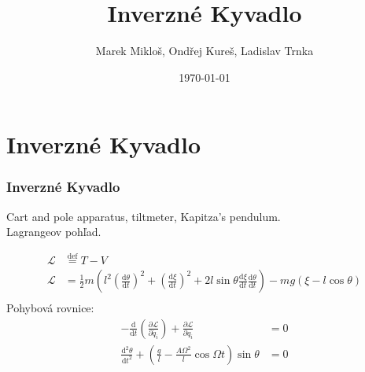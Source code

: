 \documentclass{beamer}
\title[Mechanika]{Inverzné Kyvadlo}
\author[Skupina Z] {Marek Mikloš, Ondřej Kureš, Ladislav Trnka \\ }
\institute[Charles University]{Charles University, Czech Republic}
\date{\today}
\begin{document}
\begin{frame}
\titlepage

\end{frame}


\section*{Inverzné Kyvadlo}
\label{sec: Int}


\begin{frame}
 
\frametitle{Inverzné Kyvadlo}


\begin{center}
Cart and pole apparatus, tiltmeter, Kapitza's pendulum.\\    
Lagrangeov pohľad.\\
\end{center}
\begin{small}
\begin{align*}
\mathcal{L} & \stackrel{\text{def}}{=} T-V  \\
\mathcal{L} & =  \frac{1}{2} m \left( l^{2} \left( \frac{\mathrm{d}\theta}{\mathrm{d}t}\right)^{2}+\left( \frac{\mathrm{d}\xi}{\mathrm{d}t}\right)^{2}+2l \sin \theta \frac{\mathrm{d}\xi}{\mathrm{d}t}  \frac{\mathrm{d}\theta}{\mathrm{d}t} \right) -mg \left( \xi-l \cos \theta \right) \\
\end{align*}
Pohybová rovnice:
\begin{align*}
 -\frac{\mathrm{d}}{\mathrm{d}t} \left(  \frac{\partial\mathcal{L}}{\partial\dot{q_{i}}} \right) + \frac{\partial\mathcal{L}}{\partial q_{i}}  & = 0 \\
\frac{\mathrm{d}^{2}\theta}{\mathrm{d} t^{2}}+\left(  \frac{g}{l}-\frac{A \Omega^{2}}{l} \cos \Omega t \right)   \sin \theta &= 0 \\
\end{align*}
\end{small}

\end{frame}
\end{document}

